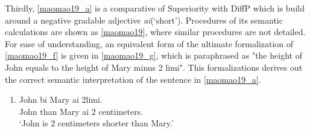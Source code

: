 \documentclass{ctexart}
\begin{document}
Thirdly, \ref{maomao19_a} is a comparative of Superiority with DiffP which is build around a negative gradable adjective \textit{ai}(`short'). Procedures of its semantic calculations are shown as \ref{maomao19}, where similar procedures are not detailed. For ease of understanding, an equivalent form of the ultimate formalization of \ref{maomao19_f} is given in \ref{maomao19_g}, which is paraphrased as "the height of John equals to the height of Mary minus 2 limi". This formalizations derives out the correct semantic interpretation of the sentence in \ref{maomao19_a}.

\begin{enumerate}
    \item \label{maomao19_a}
    John bi Mary ai 2limi. \\
    John than Mary ai 2 centimeters. \\
    `John is 2 centimeters shorter than Mary.'
\end{enumerate}
\end{document}
